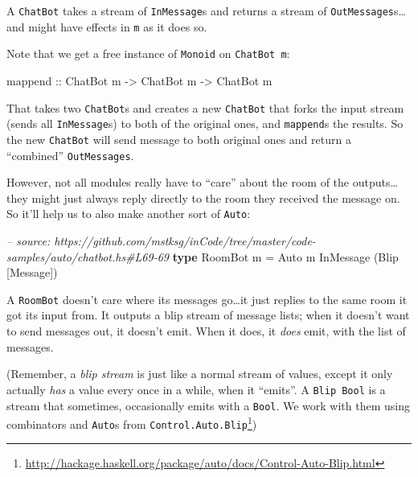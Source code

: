 \documentclass[]{article}
\newenvironment{Shaded}{}{}
\newcommand{\KeywordTok}[1]{\textcolor[rgb]{0.00,0.44,0.13}{\textbf{{#1}}}}
\newcommand{\DataTypeTok}[1]{\textcolor[rgb]{0.56,0.13,0.00}{{#1}}}
\newcommand{\CommentTok}[1]{\textcolor[rgb]{0.38,0.63,0.69}{\textit{{#1}}}}
\newcommand{\OtherTok}[1]{\textcolor[rgb]{0.00,0.44,0.13}{{#1}}}
\newcommand{\FunctionTok}[1]{\textcolor[rgb]{0.02,0.16,0.49}{{#1}}}
\newcommand{\NormalTok}[1]{{#1}}
\renewcommand{\href}[2]{#2\footnote{\url{#1}}}
\begin{document}
A \texttt{ChatBot} takes a stream of \texttt{InMessage}s and returns a
stream of \texttt{OutMessages}s\ldots{}and might have effects in
\texttt{m} as it does so.

Note that we get a free instance of \texttt{Monoid} on
\texttt{ChatBot\ m}:

\begin{Shaded}
\begin{Highlighting}[]
\OtherTok{mappend ::} \DataTypeTok{ChatBot} \NormalTok{m }\OtherTok{->} \DataTypeTok{ChatBot} \NormalTok{m }\OtherTok{->} \DataTypeTok{ChatBot} \NormalTok{m}
\end{Highlighting}
\end{Shaded}

That takes two \texttt{ChatBot}s and creates a new \texttt{ChatBot} that
forks the input stream (sends all \texttt{InMessage}s) to both of the
original ones, and \texttt{mappend}s the results. So the new
\texttt{ChatBot} will send message to both original ones and return a
``combined'' \texttt{OutMessages}.

However, not all modules really have to ``care'' about the room of the
outputs\ldots{}they might just always reply directly to the room they
received the message on. So it'll help us to also make another sort of
\texttt{Auto}:

\begin{Shaded}
\begin{Highlighting}[]
\CommentTok{-- source: https://github.com/mstksg/inCode/tree/master/code-samples/auto/chatbot.hs#L69-69}
\KeywordTok{type} \DataTypeTok{RoomBot} \NormalTok{m }\FunctionTok{=} \DataTypeTok{Auto} \NormalTok{m }\DataTypeTok{InMessage} \NormalTok{(}\DataTypeTok{Blip} \NormalTok{[}\DataTypeTok{Message}\NormalTok{])}
\end{Highlighting}
\end{Shaded}

A \texttt{RoomBot} doesn't care where its messages go\ldots{}it just
replies to the same room it got its input from. It outputs a blip stream
of message lists; when it doesn't want to send messages out, it doesn't
emit. When it does, it \emph{does} emit, with the list of messages.

(Remember, a \emph{blip stream} is just like a normal stream of values,
except it only actually \emph{has} a value every once in a while, when
it ``emits''. A \texttt{Blip\ Bool} is a stream that sometimes,
occasionally emits with a \texttt{Bool}. We work with them using
combinators and \texttt{Auto}s from
\href{http://hackage.haskell.org/package/auto/docs/Control-Auto-Blip.html}{\texttt{Control.Auto.Blip}})
\end{document}
